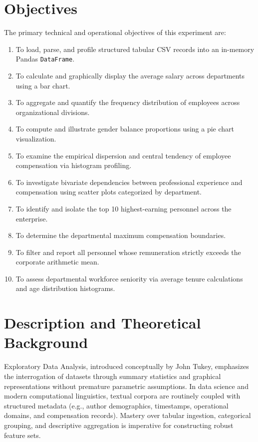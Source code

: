 \section{Objectives}
The primary technical and operational objectives of this experiment are:
\begin{enumerate}[label=\textbf{\arabic*.}]
    \item To load, parse, and profile structured tabular CSV records into an in-memory Pandas \texttt{DataFrame}.
    \item To calculate and graphically display the average salary across departments using a bar chart.
    \item To aggregate and quantify the frequency distribution of employees across organizational divisions.
    \item To compute and illustrate gender balance proportions using a pie chart visualization.
    \item To examine the empirical dispersion and central tendency of employee compensation via histogram profiling.
    \item To investigate bivariate dependencies between professional experience and compensation using scatter plots categorized by department.
    \item To identify and isolate the top 10 highest-earning personnel across the enterprise.
    \item To determine the departmental maximum compensation boundaries.
    \item To filter and report all personnel whose remuneration strictly exceeds the corporate arithmetic mean.
    \item To assess departmental workforce seniority via average tenure calculations and age distribution histograms.
\end{enumerate}

\section{Description and Theoretical Background}
Exploratory Data Analysis, introduced conceptually by John Tukey, emphasizes the interrogation of datasets through summary statistics and graphical representations without premature parametric assumptions. In data science and modern computational linguistics, textual corpora are routinely coupled with structured metadata (e.g., author demographics, timestamps, operational domains, and compensation records). Mastery over tabular ingestion, categorical grouping, and descriptive aggregation is imperative for constructing robust feature sets.

